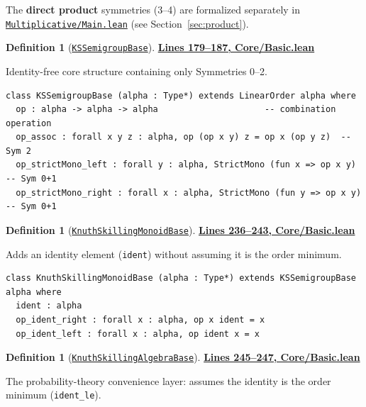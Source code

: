 \documentclass[11pt]{article}
\theoremstyle{definition}
\newtheorem{definition}[theorem]{Definition}
\theoremstyle{remark}
\begin{document}
The \textbf{direct product} symmetries (3--4) are formalized separately in \href{https://github.com/zariuq/ks-foundations-of-inference/blob/main/KnuthSkilling/Multiplicative/Main.lean}{\texttt{Multiplicative/Main.lean}} (see Section~\ref{sec:product}).

\begin{definition}[\href{https://github.com/zariuq/ks-foundations-of-inference/blob/main/KnuthSkilling/Core/Basic.lean\#L179}{\texttt{KSSemigroupBase}}]
\textbf{\href{https://github.com/zariuq/ks-foundations-of-inference/blob/main/KnuthSkilling/Core/Basic.lean\#L179-L187}{Lines 179--187, Core/Basic.lean}}

Identity-free core structure containing only Symmetries 0--2.
\end{definition}

\begin{lstlisting}[caption={Identity-free semigroup base}]
class KSSemigroupBase (alpha : Type*) extends LinearOrder alpha where
  op : alpha -> alpha -> alpha                     -- combination operation
  op_assoc : forall x y z : alpha, op (op x y) z = op x (op y z)  -- Sym 2
  op_strictMono_left : forall y : alpha, StrictMono (fun x => op x y)   -- Sym 0+1
  op_strictMono_right : forall x : alpha, StrictMono (fun y => op x y)  -- Sym 0+1
\end{lstlisting}

\begin{definition}[\href{https://github.com/zariuq/ks-foundations-of-inference/blob/main/KnuthSkilling/Core/Basic.lean\#L236}{\texttt{KnuthSkillingMonoidBase}}]
\textbf{\href{https://github.com/zariuq/ks-foundations-of-inference/blob/main/KnuthSkilling/Core/Basic.lean\#L236-L243}{Lines 236--243, Core/Basic.lean}}

Adds an identity element (\texttt{ident}) without assuming it is the order minimum.
\end{definition}

\begin{lstlisting}[caption={Core K\&S structure with identity (no positivity assumption)}]
class KnuthSkillingMonoidBase (alpha : Type*) extends KSSemigroupBase alpha where
  ident : alpha
  op_ident_right : forall x : alpha, op x ident = x
  op_ident_left : forall x : alpha, op ident x = x
\end{lstlisting}

\begin{definition}[\href{https://github.com/zariuq/ks-foundations-of-inference/blob/main/KnuthSkilling/Core/Basic.lean\#L245}{\texttt{KnuthSkillingAlgebraBase}}]
\textbf{\href{https://github.com/zariuq/ks-foundations-of-inference/blob/main/KnuthSkilling/Core/Basic.lean\#L245-L247}{Lines 245--247, Core/Basic.lean}}

The probability-theory convenience layer: assumes the identity is the order minimum (\texttt{ident\_le}).
\end{definition}
\end{document}
